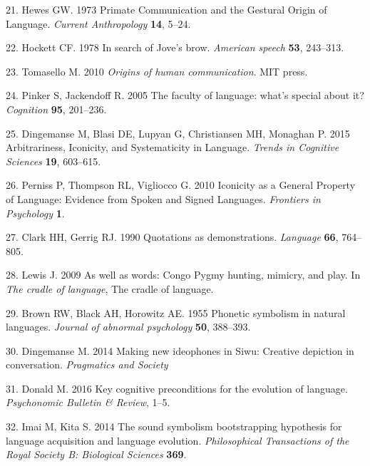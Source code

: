 \documentclass[english,floatsintext,man]{apa6}
\theoremstyle{definition}
\theoremstyle{definition}
\theoremstyle{definition}
\theoremstyle{remark}
\begin{document}
\leavevmode\hypertarget{ref-Hewes:1973vr}{}%
21. Hewes GW. 1973 Primate Communication and the Gestural Origin of
Language. \emph{Current Anthropology} \textbf{14}, 5--24.

\leavevmode\hypertarget{ref-Hockett:1978se}{}%
22. Hockett CF. 1978 In search of Jove's brow. \emph{American speech}
\textbf{53}, 243--313.

\leavevmode\hypertarget{ref-Tomasello:2010or}{}%
23. Tomasello M. 2010 \emph{Origins of human communication}. MIT press.

\leavevmode\hypertarget{ref-Pinker:2005cv}{}%
24. Pinker S, Jackendoff R. 2005 The faculty of language: what's special
about it? \emph{Cognition} \textbf{95}, 201--236.

\leavevmode\hypertarget{ref-Dingemanse:2015cu}{}%
25. Dingemanse M, Blasi DE, Lupyan G, Christiansen MH, Monaghan P. 2015
Arbitrariness, Iconicity, and Systematicity in Language. \emph{Trends in
Cognitive Sciences} \textbf{19}, 603--615.

\leavevmode\hypertarget{ref-Perniss:2010fb}{}%
26. Perniss P, Thompson RL, Vigliocco G. 2010 Iconicity as a General
Property of Language: Evidence from Spoken and Signed Languages.
\emph{Frontiers in Psychology} \textbf{1}.

\leavevmode\hypertarget{ref-Clark:1990cl}{}%
27. Clark HH, Gerrig RJ. 1990 Quotations as demonstrations.
\emph{Language} \textbf{66}, 764--805.

\leavevmode\hypertarget{ref-Lewis:2009wz}{}%
28. Lewis J. 2009 As well as words: Congo Pygmy hunting, mimicry, and
play. In \emph{The cradle of language}, The cradle of language.

\leavevmode\hypertarget{ref-Brown:1955wy}{}%
29. Brown RW, Black AH, Horowitz AE. 1955 Phonetic symbolism in natural
languages. \emph{Journal of abnormal psychology} \textbf{50}, 388--393.

\leavevmode\hypertarget{ref-Dingemanse:2014gj}{}%
30. Dingemanse M. 2014 Making new ideophones in Siwu: Creative depiction
in conversation. \emph{Pragmatics and Society}

\leavevmode\hypertarget{ref-Donald:2016kd}{}%
31. Donald M. 2016 Key cognitive preconditions for the evolution of
language. \emph{Psychonomic Bulletin \& Review}, 1--5.

\leavevmode\hypertarget{ref-Imai:2014dea}{}%
32. Imai M, Kita S. 2014 The sound symbolism bootstrapping hypothesis
for language acquisition and language evolution. \emph{Philosophical
Transactions of the Royal Society B: Biological Sciences} \textbf{369}.
\end{document}
